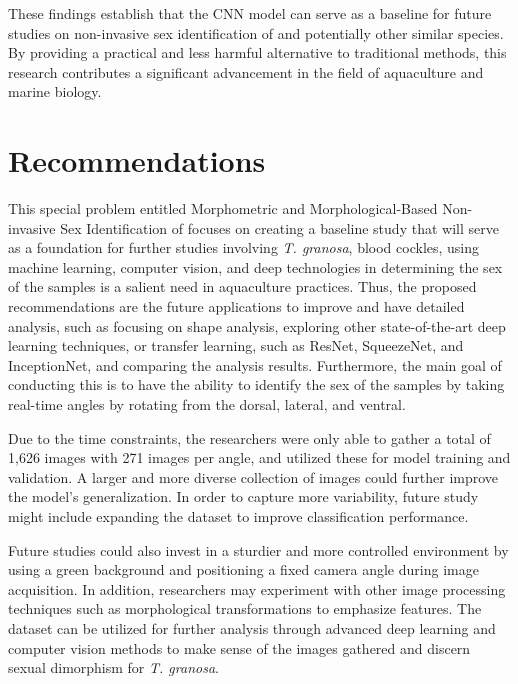These findings establish that the CNN model can serve as a baseline for future studies on non-invasive sex identification of \Tgranosa and potentially other similar species. By providing a practical and less harmful alternative to traditional methods, this research contributes a significant advancement in the field of aquaculture and marine biology.

\section{Recommendations}

This special problem entitled Morphometric and Morphological-Based Non-invasive Sex Identification of \Tgranosa focuses on creating a baseline study that will serve as a foundation for further studies involving \textit{T. granosa}, blood cockles, using machine learning, computer vision, and deep technologies in determining the sex of the samples is a salient need in aquaculture practices. Thus, the proposed recommendations are the future applications to improve and have detailed analysis, such as focusing on shape analysis, exploring other state-of-the-art deep learning techniques, or transfer learning, such as ResNet, SqueezeNet, and InceptionNet, and comparing the analysis results. Furthermore, the main goal of conducting this is to have the ability to identify the sex of the samples by taking real-time angles by rotating from the dorsal, lateral, and ventral.

Due to the time constraints, the researchers were only able to gather a total of 1,626 images with 271 images per angle, and utilized these for model training and validation. A larger and more diverse collection of images could further improve the model’s generalization. In order to capture more variability, future study might include expanding the dataset to improve classification performance. 

Future studies could also invest in a  sturdier and more controlled environment by using a green background and positioning a fixed camera angle during image acquisition. In addition, researchers may experiment with other image processing techniques such as morphological transformations to emphasize features. The dataset can be utilized for further analysis through advanced deep learning and computer vision methods to make sense of the images gathered and discern sexual dimorphism for \textit{T. granosa}. 